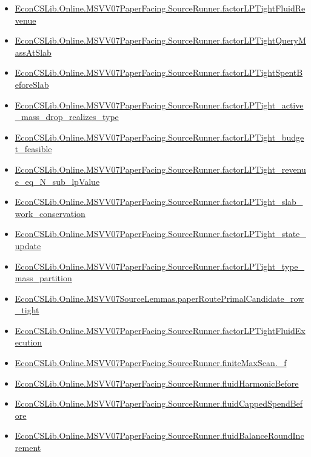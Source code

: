 \documentclass[10pt]{article}
\begin{document}
\begin{itemize}[leftmargin=1.2em]
\begin{itemize}[leftmargin=1.2em]
\item \hyperlink{library-prerequisite-b34f5140f344be84}{EconCSLib.Online.MSVV07PaperFacing.SourceRunner.factorLPTightFluidRevenue}
\item \hyperlink{library-prerequisite-e54f1305e8f95b54}{EconCSLib.Online.MSVV07PaperFacing.SourceRunner.factorLPTightQueryMassAtSlab}
\item \hyperlink{library-prerequisite-46089c42c081e4a6}{EconCSLib.Online.MSVV07PaperFacing.SourceRunner.factorLPTightSpentBeforeSlab}
\item \hyperlink{library-prerequisite-1211ed9f5586371e}{EconCSLib.Online.MSVV07PaperFacing.SourceRunner.factorLPTight\_active\_mass\_drop\_realizes\_type}
\item \hyperlink{library-prerequisite-b9831b98309c2936}{EconCSLib.Online.MSVV07PaperFacing.SourceRunner.factorLPTight\_budget\_feasible}
\item \hyperlink{library-prerequisite-9fb536fe7ebe6c05}{EconCSLib.Online.MSVV07PaperFacing.SourceRunner.factorLPTight\_revenue\_eq\_N\_sub\_lpValue}
\item \hyperlink{library-prerequisite-6513441b791c568e}{EconCSLib.Online.MSVV07PaperFacing.SourceRunner.factorLPTight\_slab\_work\_conservation}
\item \hyperlink{library-prerequisite-eb8df33980a4debe}{EconCSLib.Online.MSVV07PaperFacing.SourceRunner.factorLPTight\_state\_update}
\item \hyperlink{library-prerequisite-f198e6ee4430203c}{EconCSLib.Online.MSVV07PaperFacing.SourceRunner.factorLPTight\_type\_mass\_partition}
\item \hyperlink{library-prerequisite-f5c21c4b430f414d}{EconCSLib.Online.MSVV07SourceLemmas.paperRoutePrimalCandidate\_row\_tight}
\item \hyperlink{library-prerequisite-6efac552caeaa056}{EconCSLib.Online.MSVV07PaperFacing.SourceRunner.factorLPTightFluidExecution}
\item \hyperlink{library-prerequisite-6418d68c6d448950}{EconCSLib.Online.MSVV07PaperFacing.SourceRunner.finiteMaxScan.\_f}
\item \hyperlink{library-prerequisite-8fc7710469952f5b}{EconCSLib.Online.MSVV07PaperFacing.SourceRunner.fluidHarmonicBefore}
\item \hyperlink{library-prerequisite-48db3df86a72a40e}{EconCSLib.Online.MSVV07PaperFacing.SourceRunner.fluidCappedSpendBefore}
\item \hyperlink{library-prerequisite-84603bc21407b9a1}{EconCSLib.Online.MSVV07PaperFacing.SourceRunner.fluidBalanceRoundIncrement}

\end{itemize}
\end{itemize}
\end{document}
